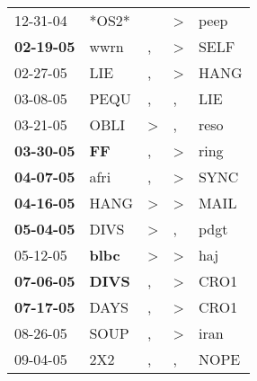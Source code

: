 \begin{supertabular}{p{0.07\textwidth}p{0.06\textwidth}p{0.02\textwidth}p{0.02\textwidth}p{0.06\textwidth}}
          12-31-04\textsuperscript{} &                            *OS2* &                  &     \textgreater &           peep\textsuperscript{} \\
 \textbf{02-19-05\textsuperscript{}} &           wwrn\textsuperscript{} &                , &     \textgreater &           SELF\textsuperscript{} \\
          02-27-05\textsuperscript{} &            LIE\textsuperscript{} &                , &     \textgreater &           HANG\textsuperscript{} \\
          03-08-05\textsuperscript{} &           PEQU\textsuperscript{} &                , &                , &            LIE\textsuperscript{} \\
          03-21-05\textsuperscript{} &           OBLI\textsuperscript{} &     \textgreater &                , &           reso\textsuperscript{} \\
 \textbf{03-30-05\textsuperscript{}} &    \textbf{FF\textsuperscript{}} &                , &     \textgreater &           ring\textsuperscript{} \\
 \textbf{04-07-05\textsuperscript{}} &           afri\textsuperscript{} &                , &     \textgreater &           SYNC\textsuperscript{} \\
 \textbf{04-16-05\textsuperscript{}} &           HANG\textsuperscript{} &     \textgreater &     \textgreater &           MAIL\textsuperscript{} \\
 \textbf{05-04-05\textsuperscript{}} &           DIVS\textsuperscript{} &     \textgreater &                , &           pdgt\textsuperscript{} \\
          05-12-05\textsuperscript{} &  \textbf{blbc\textsuperscript{}} &     \textgreater &     \textgreater &            haj\textsuperscript{} \\
 \textbf{07-06-05\textsuperscript{}} &  \textbf{DIVS\textsuperscript{}} &                , &     \textgreater &           CRO1\textsuperscript{} \\
 \textbf{07-17-05\textsuperscript{}} &           DAYS\textsuperscript{} &                , &     \textgreater &           CRO1\textsuperscript{} \\
          08-26-05\textsuperscript{} &           SOUP\textsuperscript{} &                , &     \textgreater &           iran\textsuperscript{} \\
          09-04-05\textsuperscript{} &            2X2\textsuperscript{} &                , &                , &           NOPE\textsuperscript{} \\

\end{supertabular}
